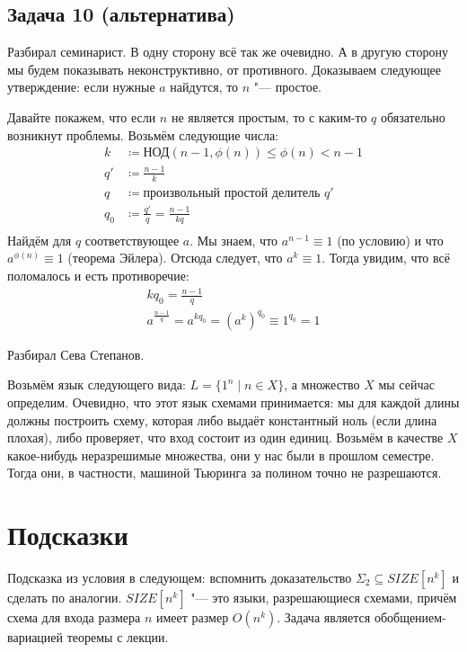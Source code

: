 \subsection{Задача 10 (альтернатива)}
	Разбирал семинарист.
	В одну сторону всё так же очевидно.
	А в другую сторону мы будем показывать неконструктивно, от противного.
	Доказываем следующее утверждение: если нужные $a$ найдутся, то $n$ "--- простое.

	Давайте покажем, что если $n$ не является простым, то с каким-то $q$ обязательно возникнут проблемы.
	Возьмём следующие числа:
	\begin{align*}
		k &\coloneq \textrm{НОД}(n-1, \phi(n)) \le \phi(n) < n - 1 \\
		q' &\coloneq \frac{n-1}{k} \\
		q &\coloneq \text{произвольный простой делитель $q'$} \\
		q_0 &\coloneq \frac{q'}{q} = \frac{n-1}{kq} \\
	\end{align*}
	Найдём для $q$ соответствующее $a$.
	Мы знаем, что $a^{n-1} \equiv 1$ (по условию) и что $a^{\phi(n)} \equiv 1$ (теорема Эйлера).
	Отсюда следует, что $a^k \equiv 1$.
	Тогда увидим, что всё поломалось и есть противоречие:
	\begin{gather*}
		kq_0 = \frac{n-1}q \\
		a^{\frac{n-1}{q}} = a^{kq_0} = (a^k)^{q_0} \equiv 1^{q_0} = 1
	\end{gather*}

	Разбирал Сева Степанов.

	Возьмём язык следующего вида: $L = \{1^n \mid n \in X\}$, а множество
	$X$ мы сейчас определим.
	Очевидно, что этот язык схемами принимается: мы для каждой длины должны построить схему,
	которая либо выдаёт константный ноль (если длина плохая), либо проверяет, что вход состоит
	из один единиц.
	Возьмём в качестве $X$ какое-нибудь неразрешимые множества, они у нас были в прошлом семестре.
	Тогда они, в частности, машиной Тьюринга за полином точно не разрешаются.

\section{Подсказки}
	Подсказка из условия в следующем: вспомнить доказательство $\Sigma_2 \subseteq SIZE[n^k]$
	и сделать по аналогии.
	$SIZE[n^k]$ "--- это языки, разрешающиеся схемами, причём схема для входа размера $n$ имеет размер $O(n^k)$.
	Задача является обобщением-вариацией теоремы с лекции.

